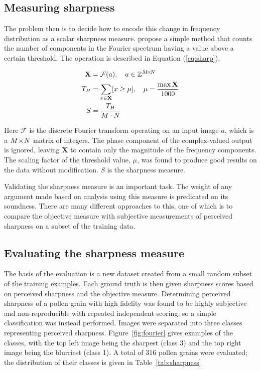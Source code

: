 \subsection{Measuring sharpness}
The problem then is to decide how to encode this change in frequency distribution as a scalar sharpness measure.
\citeauthor{de2013image} propose a simple method that counts the number of components in the Fourier spectrum having a value above a certain threshold.
The operation is described in Equation (\ref{eq:sharp}).


\begin{equation}\label{eq:sharp}
  \begin{split}
    \mathbf{X} &= \mathcal{F}(a),\quad a\in \mathbb{Z}^{M\!\times \! N}\\
    T_H &= \sum_{x\in\mathbf{X}}[x\ge\mu],\quad \mu=\frac{\max \mathbf{X}}{1000}\\
    S &= \dfrac{T_H}{M\cdot N}
  \end{split}
\end{equation}

Here \(\mathcal{F}\) is the discrete Fourier transform operating on an input image \(a\), which is a \(M\!\times \! N\) matrix of integers.
The phase component of the complex-valued output is ignored, leaving \(\mathbf{X}\) to contain only the magnitude of the frequency components.
The scaling factor of the threshold value, \(\mu \), was found to produce good results on the data without modification. \(S\) is the sharpness measure.

Validating the sharpness measure is an important task.
The weight of any argument made based on analysis using this measure is predicated on its soundness.
There are many different approaches to this, one of which is to compare the objective measure with subjective measurements of perceived sharpness on a subset of the training data.

\subsection{Evaluating the sharpness measure}
The basis of the evaluation is a new dataset created from a small random subset of the training examples.
Each ground truth is then given sharpness scores based on perceived sharpness and the objective measure.
Determining perceived sharpness of a pollen grain with high fidelity was found to be highly subjective and non-reproducible with repeated independent scoring, so a simple classification was instead performed.
Images were separated into three classes representing perceived sharpness.
Figure~\ref{fig:fourier} gives examples of the classes, with the top left image being the sharpest (class 3) and the top right image being the blurriest (class 1).
A total of 316 pollen grains were evaluated; the distribution of their classes is given in Table~\ref{tab:sharpness}

